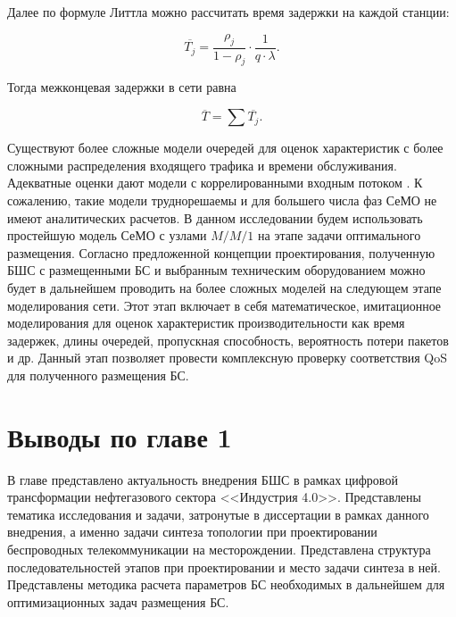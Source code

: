 Далее по формуле Литтла \cite{Little1961} можно рассчитать время задержки на каждой станции:

\begin{displaymath}
    \overline{T_j} = \frac{\rho_j}{1 - \rho_j} \cdot \frac{1}{q \cdot \lambda}.
\end{displaymath}

Тогда межконцевая задержки в сети равна

\begin{equation}
    \label{eq:end_to_end_delay}
    \overline{T}= \sum{\overline{T_j}}.
\end{equation}


Существуют более сложные модели очередей для оценок характеристик с более сложными распределения входящего трафика и времени обслуживания. Адекватные оценки дают модели с коррелированными входным потоком \cite{Vishnevsky2016_Methods_of_performance, Larionov2019}. К сожалению, такие модели труднорешаемы и для большего числа фаз СеМО не имеют аналитических расчетов. В данном исследовании будем использовать простейшую модель СеМО с узлами $M/M/1$ на этапе задачи оптимального размещения. Согласно предложенной концепции проектирования, полученную БШС с размещенными БС и выбранным техническим оборудованием можно будет в дальнейшем проводить на более сложных моделей на следующем этапе моделирования сети. Этот этап включает в себя математическое, имитационное моделирования для оценок характеристик производительности как время задержек, длины очередей, пропускная способность, вероятность потери пакетов и др. Данный этап позволяет провести комплексную проверку соответствия QoS для полученного размещения БС.

\section{Выводы по главе 1}
 
В главе представлено актуальность внедрения БШС в рамках цифровой трансформации нефтегазового сектора <<Индустрия 4.0>>. Представлены тематика исследования и задачи, затронутые в диссертации в рамках данного внедрения, а именно задачи синтеза топологии при проектировании беспроводных телекоммуникации на месторождении. Представлена структура последовательностей этапов при проектировании и место задачи синтеза в ней. Представлены методика расчета 
параметров БС необходимых в дальнейшем для оптимизационных задач размещения БС. 








\FloatBarrier
